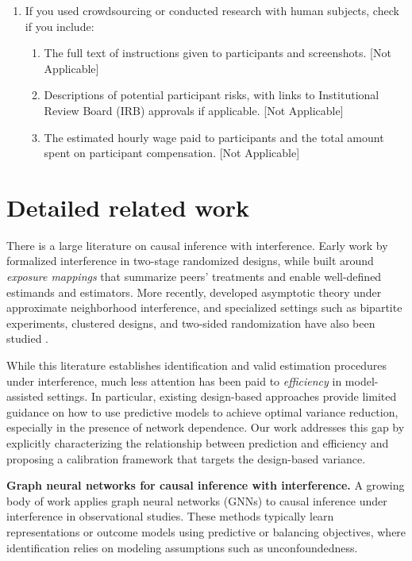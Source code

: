 \documentclass[twoside]{article}
\theoremstyle{plain}
\theoremstyle{definition}
\theoremstyle{remark}
\begin{document}
\begin{enumerate}
  \item If you used crowdsourcing or conducted research with human subjects, check if you include:
  \begin{enumerate}
    \item The full text of instructions given to participants and screenshots. [Not Applicable]
    \item Descriptions of potential participant risks, with links to Institutional Review Board (IRB) approvals if applicable. [Not Applicable]
    \item The estimated hourly wage paid to participants and the total amount spent on participant compensation. [Not Applicable]
  \end{enumerate}

\end{enumerate}

\clearpage
\appendix
\thispagestyle{empty}

\onecolumn
{}

\section{Detailed related work}\label{app:related-work}
There is a large literature on causal inference with interference. Early work by \citet{hudgens2008toward} formalized interference in two-stage randomized designs, while \citet{aronow2017estimating} built around \emph{exposure mappings} that summarize peers' treatments
and enable well-defined estimands and estimators. More recently, \citep{leung2022causal, gao2023causal} developed asymptotic theory under approximate neighborhood interference, and specialized settings such as bipartite experiments, clustered designs, and two-sided randomization have also been studied \citep{papadogeorgou2025causal, lu2025design, su2021model, Masoero2026multiple}.

While this literature establishes identification and valid estimation procedures under interference, much less attention has been paid to \emph{efficiency} in model-assisted settings. In particular, existing design-based approaches provide limited guidance on how to use predictive models to achieve optimal variance reduction, especially in the presence of network dependence. Our work addresses this gap by explicitly characterizing the relationship between prediction and efficiency and proposing a calibration framework that targets the design-based variance.

\textbf{Graph neural networks for causal inference with interference.}
A growing body of work applies graph neural networks (GNNs) to causal inference under interference \citep{wu2025causal, jiang2022estimating, guo2020learning, guo2021ignite, cai2023generalization, chen2024doubly, ma2021causal, du2025telling, ma2022learning, leung2022graph} in observational studies. These methods typically learn representations or outcome models using predictive or balancing objectives, where identification relies on modeling assumptions such as unconfoundedness.
\end{document}

